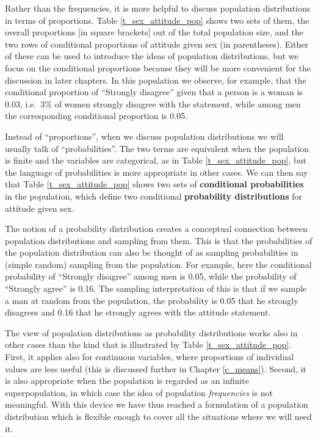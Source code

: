 Rather than the frequencies, it is more helpful to discuss population
distributions in terms of proportions. Table \ref{t_sex_attitude_pop}
shows two sets of them, the overall proportions [in square brackets] out
of the total population size, and the two rows of conditional
proportions of attitude given sex (in parentheses). Either of these can
be used to introduce the ideas of population distributions, but we focus
on the conditional proportions because they will  be more convenient for
the discussion in later chapters. In this population we observe, for
example, that the conditional proportion of ``Strongly disagree'' given
that a person is a woman is 0.03, i.e.\ 3\% of women strongly
disagree with the statement, while among men the corresponding
conditional proportion is 0.05.

Instead of ``proportions'', when we discuss population distributions we
will usually talk of ``probabilities''. The two terms are equivalent
when the population is finite and the variables are categorical, as in
Table \ref{t_sex_attitude_pop}, but the language of probabilities is
more appropriate in other cases. We can then say that Table
\ref{t_sex_attitude_pop} shows two sets of \textbf{conditional
probabilities} in the population, which define two conditional
\textbf{probability distributions} for attitude given sex.

The notion of a probability distribution creates a conceptual connection
between population distributions and sampling from them. This is that
the probabilities of the population distribution can also be thought of
as sampling probabilities in (simple random) sampling from the
population. For example, here the conditional probability of ``Strongly
disagree'' among men is 0.05, while the probability of ``Strongly
agree'' is 0.16. The sampling interpretation of this is that if we
sample a man at random from the population, the probability is 0.05
that he strongly disagrees and 0.16 that he strongly agrees with the
attitude statement.

The view of population distributions as probability distributions works
also in other cases than the kind that is illustrated by Table
\ref{t_sex_attitude_pop}. First, it applies also for continuous
variables, where proportions of individual values are less useful (this
is discussed further in Chapter \ref{c_means}). Second, it is also
appropriate when the population is regarded as an infinite
superpopulation, in which case the idea of population \emph{frequencies}
is not meaningful. With this device we have thus reached a formulation of
a population distribution which is flexible enough to cover all the
situations where we will need it.


